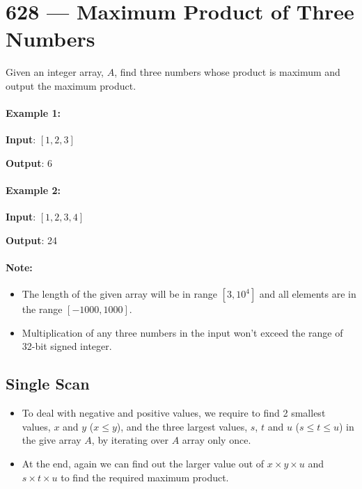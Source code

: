 \section{628 --- Maximum Product of Three Numbers}
Given an integer array, $A$, find three numbers whose product is maximum and output the maximum product.

\paragraph{Example 1:}
\begin{flushleft}


\textbf{Input}: $[1,2,3]$

\textbf{Output}: 6
 
\end{flushleft}

\paragraph{Example 2:}

\begin{flushleft}
\textbf{Input}: $[1,2,3,4]$

\textbf{Output}: 24
\end{flushleft} 

\paragraph{Note:}
\begin{itemize}
    \item The length of the given array will be in range $[3,10^4]$ and all elements are in the range $[-1000, 1000]$.
    \item Multiplication of any three numbers in the input won't exceed the range of 32-bit signed integer.
\end{itemize}

\subsection{Single Scan}
\begin{itemize}
    \item To deal with negative and positive values, we require to find 2 smallest values, $x$ and $y$ ($x\leq y$), and the three largest values, $s$, $t$ and $u$ ($s\leq t\leq u$) in the give array $A$, by iterating over $A$ array only once.
    \item At the end, again we can find out the larger value out of $x\times y \times u$ and $s\times t\times u$ to find the required maximum product.
\end{itemize}